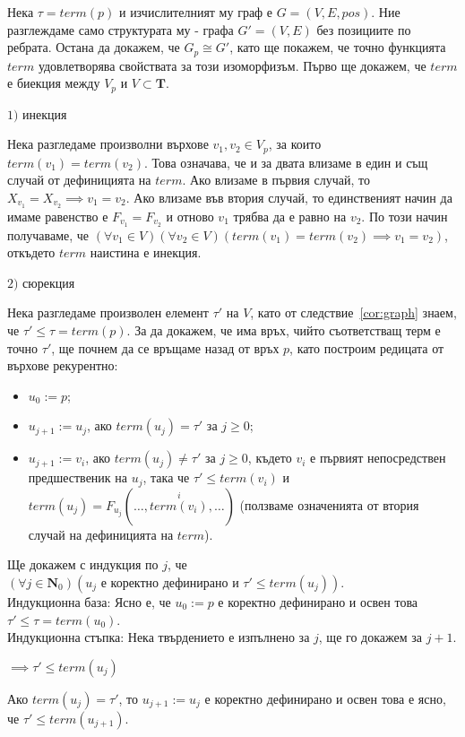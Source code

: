 \documentclass[12pt,twoside,a4paper]{article}
\begin{document}
\begin{statement}
		Нека $\tau = term(p)$ и изчислителният му граф е $G=(V,E,pos)$. Ние разглеждаме само структурата му - графа $G'=(V,E)$ без позициите по ребрата. Остана да докажем, че $G_p \cong G'$, като ще покажем, че точно функцията $term$ удовлетворява свойствата за този изоморфизъм. Първо ще докажем, че $term$ е биекция между $V_p$ и $V \subset \mathbf{T}$.
		
		$1)$ инекция
		
		Нека разгледаме произволни върхове $v_1, v_2 \in V_p$, за които $term(v_1)=term(v_2)$. Това означава, че и за двата влизаме в един и същ случай от дефиницията на $term$. Ако влизаме в първия случай, то $X_{v_1}=X_{v_2} \implies v_1 = v_2$. Ако влизаме във втория случай, то единственият начин да имаме равенство е $F_{v_1}=F_{v_2}$ и отново $v_1$ трябва да е равно на $v_2$. По този начин получаваме, че $(\forall v_1 \in V)(\forall v_2 \in V)(term(v_1)=term(v_2) \implies v_1 = v_2)$, откъдето $term$ наистина е инекция.
		
		$2)$ сюрекция
		
		Нека разгледаме произволен елемент $\tau'$ на $V$, като от следствие~\ref{cor:graph} знаем, че $\tau' \leq \tau = term(p)$. За да докажем, че има връх, чийто съответстващ терм е точно $\tau'$, ще почнем да се връщаме назад от връх $p$, като построим редицата от върхове рекурентно:
		\begin{itemize}
			\item $u_0:=p$;
			\item $u_{j+1} := u_j$, ако $term(u_j) = \tau'$ за $j \ge 0$;
			\item $u_{j+1} := v_i$, ако $term(u_j) \neq \tau'$ за $j \ge 0$, където $v_i$ е първият непосредствен предшественик на $u_j$, така че $\tau' \leq term(v_i)$ и $term(u_j) = F_{u_j}(\dots, \overset{i}{term(v_i)}, \dots)$ (ползваме означенията от втория случай на дефиницията на $term$).
		\end{itemize}
		Ще докажем с индукция по $j$, че $(\forall j \in \mathbf{N}_0)(u_j\text{ е коректно дефинирано и } \tau' \leq term(u_j))$.\\
		\indent Индукционна база: Ясно е, че $u_0 := p$ е коректно дефинирано и освен това $\tau' \leq \tau = term(u_0)$.\\
		\indent Индукционна стъпка: Нека твърдението е изпълнено за $j$, ще го докажем за $j+1$.
		
		\noindent$\implies \tau' \leq term(u_j)$
		
		Ако $term(u_j) = \tau'$, то $u_{j+1}:=u_j$ е коректно дефинирано и освен това е ясно, че $\tau' \leq term(u_{j+1})$.
		

\end{statement}
\end{document}
